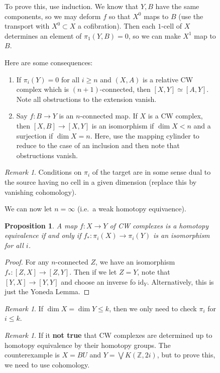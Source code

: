 \documentclass[leqno, openany]{memoir}
\newtheorem{prop}[thm]{Proposition}
\theoremstyle{definition}
\theoremstyle{remark}
\newtheorem{rmk}[thm]{Remark}
\theoremstyle{plain}
\theoremstyle{definition}
\theoremstyle{remark}
\newcommand{\Z}{\mathbb{Z}}
\newcommand{\mr}[1]{\mathrm{#1}}
\begin{document}
\begin{figure}[H]
\begin{enumerate}
        To prove this, use induction. We know that $Y,B$ have the same
components, so we may deform $f$ so that $X^0$ maps to $B$ (use the transport
with $X^0 \subset X$ a cofibration). Then each $1$-cell of $X$ determines an
element of $\pi_1(Y,B) = 0$, so we can make $X^1$ map to $B$.  \end{enumerate}

Here are some consequences: \begin{enumerate} \item If $\pi_i(Y) = 0$ for all
    $i \geq n$ and $(X,A)$ is a relative CW complex which is $(n+1)$-connected,
    then $[X,Y] \simeq [A,Y]$. Note all obstructions to the extension vanish.
\item Say $f \colon B \to Y$ is an $n$-connected map. If $X$ is a CW complex,
    then $[X,B] \to [X,Y]$ is an isomorphism if $\dim X < n$ and a surjection
    if $\dim X = n$. Here, use the mapping cylinder to reduce to the case of an
    inclusion and then note that obstructions vanish.  \end{enumerate}

\begin{rmk} Conditions on $\pi_i$ of the target are in some sense dual to the
source having no cell in a given dimension (replace this by vanishing
cohomology).  \end{rmk}

We can now let $n = \infty$ (i.e.~a weak homotopy equivaence).

\begin{prop} A map $f \colon X \to Y$ of CW complexes is a homotopy equivalence
if and only if $f_* \colon \pi_i(X) \to \pi_i(Y)$ is an isomorphism for all
$i$.  \end{prop}

\begin{proof} For any $n$-connected $Z$, we have an isomorphism $f_* \colon
[Z,X] \to [Z,Y]$. Then if we let $Z = Y$, note that $[Y,X] \to [Y,Y]$ and
choose an inverse fo $\mr{id}_Y$. Alternatively, this is just the Yoneda Lemma.
\end{proof}

\begin{rmk} If $\dim X = \dim Y \leq k$, then we only need to check $\pi_i$ for
$i \leq k$.  \end{rmk}

\begin{rmk} If it \textbf{not true} that CW complexes are determined up to
homotopy equivalence by their homotopy groups. The counterexample is $X = BU$
and $Y = \bigvee K(\Z, 2i)$, but to prove this, we need to use cohomology.
\end{rmk}


\end{figure}
\end{document}
